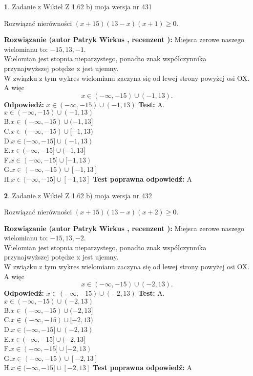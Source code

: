 \documentclass[12pt, a4paper]{article}
\theoremstyle{definition} %
\newtheorem{zad}{}
\newcommand{\zadStart}[1]{\begin{zad}#1\newline}
\newcommand{\zadStop}{\end{zad}}
\newcommand{\rozwStart}[2]{\noindent \textbf{Rozwiązanie (autor #1 , recenzent #2): }\newline}
\newcommand{\rozwStop}{\newline}
\newcommand{\odpStart}{\noindent \textbf{Odpowiedź:}\newline}
\newcommand{\odpStop}{\newline}
\newcommand{\testStart}{\noindent \textbf{Test:}\newline}
\newcommand{\testStop}{\newline}
\newcommand{\kluczStart}{\noindent \textbf{Test poprawna odpowiedź:}\newline}
\newcommand{\kluczStop}{\newline}
\begin{document}
\zadStart{Zadanie z Wikieł Z 1.62 b) moja wersja nr 431}

Rozwiązać nierówności $(x+15)(13-x)(x+1)\ge0$.
\zadStop
\rozwStart{Patryk Wirkus}{}
Miejsca zerowe naszego wielomianu to: $-15, 13, -1$.\\
Wielomian jest stopnia nieparzystego, ponadto znak współczynnika przy\linebreak najwyższej potędze x jest ujemny.\\ W związku z tym wykres wielomianu zaczyna się od lewej strony powyżej osi OX. A więc $$x \in (-\infty,-15) \cup (-1,13).$$
\rozwStop
\odpStart
$x \in (-\infty,-15) \cup (-1,13)$
\odpStop
\testStart
A.$x \in (-\infty,-15) \cup (-1,13)$\\
B.$x \in (-\infty,-15) \cup (-1,13]$\\
C.$x \in (-\infty,-15) \cup [-1,13)$\\
D.$x \in (-\infty,-15] \cup (-1,13)$\\
E.$x \in (-\infty,-15] \cup (-1,13]$\\
F.$x \in (-\infty,-15] \cup [-1,13)$\\
G.$x \in (-\infty,-15) \cup [-1,13]$\\
H.$x \in (-\infty,-15] \cup [-1,13]$
\testStop
\kluczStart
A
\kluczStop



\zadStart{Zadanie z Wikieł Z 1.62 b) moja wersja nr 432}

Rozwiązać nierówności $(x+15)(13-x)(x+2)\ge0$.
\zadStop
\rozwStart{Patryk Wirkus}{}
Miejsca zerowe naszego wielomianu to: $-15, 13, -2$.\\
Wielomian jest stopnia nieparzystego, ponadto znak współczynnika przy\linebreak najwyższej potędze x jest ujemny.\\ W związku z tym wykres wielomianu zaczyna się od lewej strony powyżej osi OX. A więc $$x \in (-\infty,-15) \cup (-2,13).$$
\rozwStop
\odpStart
$x \in (-\infty,-15) \cup (-2,13)$
\odpStop
\testStart
A.$x \in (-\infty,-15) \cup (-2,13)$\\
B.$x \in (-\infty,-15) \cup (-2,13]$\\
C.$x \in (-\infty,-15) \cup [-2,13)$\\
D.$x \in (-\infty,-15] \cup (-2,13)$\\
E.$x \in (-\infty,-15] \cup (-2,13]$\\
F.$x \in (-\infty,-15] \cup [-2,13)$\\
G.$x \in (-\infty,-15) \cup [-2,13]$\\
H.$x \in (-\infty,-15] \cup [-2,13]$
\testStop
\kluczStart
A
\kluczStop
\end{document}
